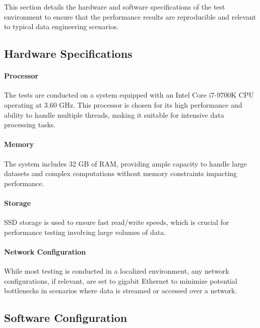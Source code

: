 
This section details the hardware and software specifications of the test environment to ensure that the performance results are reproducible and relevant to typical data engineering scenarios.

\subsection{Hardware Specifications}

    \paragraph{Processor} The tests are conducted on a system equipped with an Intel Core i7-9700K CPU operating at 3.60 GHz. This processor is chosen for its high performance and ability to handle multiple threads, making it suitable for intensive data processing tasks.
    \paragraph{Memory} The system includes 32 GB of RAM, providing ample capacity to handle large datasets and complex computations without memory constraints impacting performance.
    \paragraph{Storage} SSD storage is used to ensure fast read/write speeds, which is crucial for performance testing involving large volumes of data.
    \paragraph{Network Configuration} While most testing is conducted in a localized environment, any network configurations, if relevant, are set to gigabit Ethernet to minimize potential bottlenecks in scenarios where data is streamed or accessed over a network.

    \subsection{Software Configuration}

